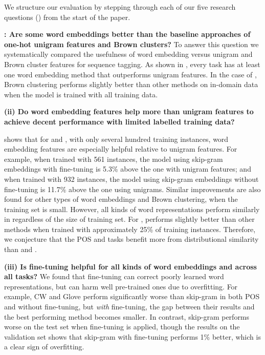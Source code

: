 We structure our evaluation by stepping through each of our five
research questions (\RQ[1--5]) from the start of the paper.

\textbf{\RQ[1]: Are some word embeddings better than the baseline approaches of one-hot unigram features and Brown clusters?}
To answer this question we systematically compared the usefulness of word embedding versus
unigram and Brown cluster features for sequence tagging.
As shown in , every task has at least one word embedding method that outperforms
unigram features. In the case of \chunking, Brown clustering performs slightly better than other methods on in-domain data when the model is trained with all training data. 


\textbf{(ii) Do word embedding features help more than unigram features to achieve decent performance with limited labelled training data?}

 shows that for \pos and \ner, with only several hundred training instances, 
word embedding features are especially helpful relative to unigram features. 
For example, when trained with 561 instances, the \pos model using skip-gram embeddings with fine-tuning is 5.3\% above
the one with unigram features; and when trained with 932 instances, the \ner model using skip-gram embeddings without fine-tuning is 11.7\% above the one using unigrams. 
Similar improvements are also found for other types of word embeddings and Brown clustering, when the training set is small. 
However, all kinds of word representations perform similarly in \chunking regardless of the size of training set. 
For \mwe, \Brown performs slightly better than other methods when trained with approximately 25\% of training instances. Therefore, we conjecture that the POS and \ner tasks benefit more from distributional similarity than \chunking and \mwe.

\textbf{(iii) Is fine-tuning helpful for all kinds of word embeddings and across all tasks?}
We found that fine-tuning can correct poorly learned word representations, but can harm well pre-trained ones due to overfitting. For example, CW and Glove perform significantly worse than skip-gram in both POS and \ner without fine-tuning, but \emph{with} fine-tuning, the gap between their results and the best performing method becomes smaller. In contrast, skip-gram performs worse on the test set when fine-tuning is applied, though the results on the validation set shows that skip-gram with fine-tuning performs 1\% better, which is a clear sign of overfitting.

